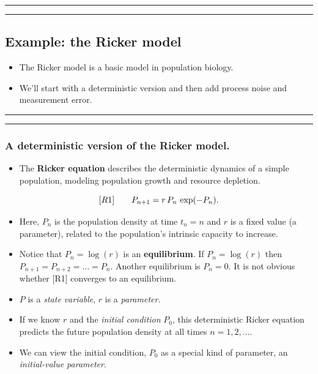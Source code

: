 \documentclass[]{article}
\providecommand{\tightlist}{%
  \setlength{\itemsep}{0pt}\setlength{\parskip}{0pt}}
\begin{document}
\begin{center}\rule{0.5\linewidth}{\linethickness}\end{center}

\begin{center}\rule{0.5\linewidth}{\linethickness}\end{center}

\subsection{Example: the Ricker model}\label{example-the-ricker-model}

\begin{itemize}
\item
  The Ricker model is a basic model in population biology.
\item
  We'll start with a deterministic version and then add process noise
  and measurement error.
\end{itemize}

\begin{center}\rule{0.5\linewidth}{\linethickness}\end{center}

\begin{center}\rule{0.5\linewidth}{\linethickness}\end{center}

\subsubsection{A deterministic version of the Ricker
model.}\label{a-deterministic-version-of-the-ricker-model.}

\begin{itemize}
\tightlist
\item
  The \textbf{Ricker equation} describes the deterministic dynamics of a
  simple population, modeling population growth and resource depletion.
\end{itemize}

$$[R1] \quad\quad \displaystyle P_{n+1} = r\,P_{n}\,\exp(-P_{n}).$$

\begin{itemize}
\item
  Here, \(P_n\) is the population density at time \(t_n=n\) and \(r\) is
  a fixed value (a parameter), related to the population's intrinsic
  capacity to increase.
\item
  Notice that \(P_n=\log(r)\) is an \textbf{equilibrium}. If
  \(P_n=\log(r)\) then \(P_{n+1}=P_{n+2}=\dots = P_n\). Another
  equilibrium is \(P_n=0\). It is not obvious whether {[}R1{]} converges
  to an equilibrium.
\item
  \(P\) is a \emph{state variable}, \(r\) is a \emph{parameter}.
\item
  If we know \(r\) and the \emph{initial condition} \(P_0\), this
  deterministic Ricker equation predicts the future population density
  at all times \(n=1,2,\dots\).
\item
  We can view the initial condition, \(P_0\) as a special kind of
  parameter, an \emph{initial-value parameter}.
\end{itemize}
\end{document}
